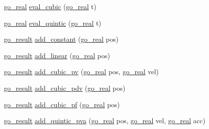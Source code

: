 \begin{DoxyCompactItemize}
\item 
\hyperlink{gotypes_8h_afd666a2393eebd71ee455846ac9def9b}{go\-\_\-real} \hyperlink{classgomotion_1_1go__interp_aa09d64f59f90da484006f8f90e4b88ec}{eval\-\_\-cubic} (\hyperlink{gotypes_8h_afd666a2393eebd71ee455846ac9def9b}{go\-\_\-real} t)
\item 
\hyperlink{gotypes_8h_afd666a2393eebd71ee455846ac9def9b}{go\-\_\-real} \hyperlink{classgomotion_1_1go__interp_ac7da42248cfef9fc204af4a56478c112}{eval\-\_\-quintic} (\hyperlink{gotypes_8h_afd666a2393eebd71ee455846ac9def9b}{go\-\_\-real} t)
\item 
\hyperlink{gotypes_8h_a55d48b38cd959f63c7e8db8337a9792a}{go\-\_\-result} \hyperlink{classgomotion_1_1go__interp_ad8d36b40bae0ffbcd9dd65e1c980bcac}{add\-\_\-constant} (\hyperlink{gotypes_8h_afd666a2393eebd71ee455846ac9def9b}{go\-\_\-real} pos)
\item 
\hyperlink{gotypes_8h_a55d48b38cd959f63c7e8db8337a9792a}{go\-\_\-result} \hyperlink{classgomotion_1_1go__interp_a1347f0aa419953ed253342575d84467d}{add\-\_\-linear} (\hyperlink{gotypes_8h_afd666a2393eebd71ee455846ac9def9b}{go\-\_\-real} pos)
\item 
\hyperlink{gotypes_8h_a55d48b38cd959f63c7e8db8337a9792a}{go\-\_\-result} \hyperlink{classgomotion_1_1go__interp_ac90831ea1decf5c6246804f63442da39}{add\-\_\-cubic\-\_\-pv} (\hyperlink{gotypes_8h_afd666a2393eebd71ee455846ac9def9b}{go\-\_\-real} pos, \hyperlink{gotypes_8h_afd666a2393eebd71ee455846ac9def9b}{go\-\_\-real} vel)
\item 
\hyperlink{gotypes_8h_a55d48b38cd959f63c7e8db8337a9792a}{go\-\_\-result} \hyperlink{classgomotion_1_1go__interp_a773b7a056931239a44b10117ab3c8f0a}{add\-\_\-cubic\-\_\-pdv} (\hyperlink{gotypes_8h_afd666a2393eebd71ee455846ac9def9b}{go\-\_\-real} pos)
\item 
\hyperlink{gotypes_8h_a55d48b38cd959f63c7e8db8337a9792a}{go\-\_\-result} \hyperlink{classgomotion_1_1go__interp_a57fd91ae3b1e836908a167c794c8acc2}{add\-\_\-cubic\-\_\-pf} (\hyperlink{gotypes_8h_afd666a2393eebd71ee455846ac9def9b}{go\-\_\-real} pos)
\item 
\hyperlink{gotypes_8h_a55d48b38cd959f63c7e8db8337a9792a}{go\-\_\-result} \hyperlink{classgomotion_1_1go__interp_a1fdb61083aca63190d3538a14744d9ba}{add\-\_\-quintic\-\_\-pva} (\hyperlink{gotypes_8h_afd666a2393eebd71ee455846ac9def9b}{go\-\_\-real} pos, \hyperlink{gotypes_8h_afd666a2393eebd71ee455846ac9def9b}{go\-\_\-real} vel, \hyperlink{gotypes_8h_afd666a2393eebd71ee455846ac9def9b}{go\-\_\-real} acc)
\item 

\end{DoxyCompactItemize}

